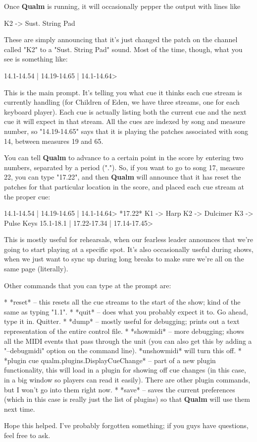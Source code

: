 \documentclass{article}
\newcommand{\q}{{\sf\bf{Qualm}}\xspace}
\begin{document}
Once \q is running, it will occasionally pepper the output with lines
like

    K2 -> Sust. String Pad

These are simply announcing that it's just changed the patch on the
channel called "K2" to a "Sust. String Pad" sound.  Most of the time,
though, what you see is something like:

    14.1-14.54 | 14.19-14.65 | 14.1-14.64>

This is the main prompt.  It's telling you what cue it thinks each cue
stream is currently handling (for Children of Eden, we have three
streams, one for each keyboard player).  Each cue is actually listing
both the current cue and the next cue it will expect in that stream. 
All the cues are indexed by song and measure number, so "14.19-14.65"
says that it is playing the patches associated with song 14, between
measures 19 and 65.

You can tell \q to advance to a certain point in the score by
entering two numbers, separated by a period (".").  So, if you want to
go to song 17, measure 22, you can type "17.22", and then \q will
announce that it has reset the patches for that particular location in
the score, and placed each cue stream at the proper cue:

    14.1-14.54 | 14.19-14.65 | 14.1-14.64> *17.22*
    K1 -> Harp
    K2 -> Dulcimer
    K3 -> Pulse Keys
    15.1-18.1 | 17.22-17.34 | 17.14-17.45>

This is mostly useful for rehearsals, when our fearless leader announces
that we're going to start playing at a specific spot.  It's also
occasionally useful during shows, when we just want to sync up during
long breaks to make sure we're all on the same page (literally).

Other commands that you can type at the prompt are:

    * *reset* -- this resets all the cue streams to the start of the
      show; kind of the same as typing "1.1".
    * *quit* -- does what you probably expect it to.  Go ahead, type it
      in.  Quitter.
    * *dump* -- mostly useful for debugging; prints out a text
      representation of the entire control file.
    * *showmidi* -- more debugging; shows all the MIDI events that pass
      through the unit (you can also get this by adding a "--debugmidi"
      option on the command line).  *unshowmidi* will turn this off.
    * *plugin cue qualm.plugins.DisplayCueChange* -- part of a new
      plugin functionality, this will load in a plugin for showing off
      cue changes (in this case, in a big window so players can read it
      easily).  There are other plugin commands, but I won't go into
      them right now.
    * *save* -- saves the current preferences (which in this case is
      really just the list of plugins) so that \q will use them next
      time.

Hope this helped.  I've probably forgotten something; if you guys have
questions, feel free to ask.
\end{document}
